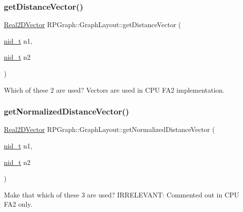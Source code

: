 \subsubsection{\texorpdfstring{get\+Distance\+Vector()}{getDistanceVector()}}
{\footnotesize\ttfamily \mbox{\hyperlink{classRPGraph_1_1Real2DVector}{Real2\+D\+Vector}} R\+P\+Graph\+::\+Graph\+Layout\+::get\+Distance\+Vector (\begin{DoxyParamCaption}\item[{\mbox{\hyperlink{namespaceRPGraph_ab3ae34f1ab88e48f43794c30c8697b74}{nid\+\_\+t}}}]{n1,  }\item[{\mbox{\hyperlink{namespaceRPGraph_ab3ae34f1ab88e48f43794c30c8697b74}{nid\+\_\+t}}}]{n2 }\end{DoxyParamCaption})}

Which of these 2 are used? Vectors are used in C\+PU F\+A2 implementation. \mbox{\label{classRPGraph_1_1GraphLayout_a3e3e2ba138f5b416a32f52d957926da5}} 
\subsubsection{\texorpdfstring{get\+Normalized\+Distance\+Vector()}{getNormalizedDistanceVector()}}
{\footnotesize\ttfamily \mbox{\hyperlink{classRPGraph_1_1Real2DVector}{Real2\+D\+Vector}} R\+P\+Graph\+::\+Graph\+Layout\+::get\+Normalized\+Distance\+Vector (\begin{DoxyParamCaption}\item[{\mbox{\hyperlink{namespaceRPGraph_ab3ae34f1ab88e48f43794c30c8697b74}{nid\+\_\+t}}}]{n1,  }\item[{\mbox{\hyperlink{namespaceRPGraph_ab3ae34f1ab88e48f43794c30c8697b74}{nid\+\_\+t}}}]{n2 }\end{DoxyParamCaption})}

Make that which of these 3 are used? I\+R\+R\+E\+L\+E\+V\+A\+NT\+: Commented out in C\+PU F\+A2 only. \mbox{\label{classRPGraph_1_1GraphLayout_a805e477534bbf72275ecf8d5ec396da4}} 
